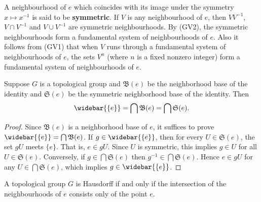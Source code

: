 A neighbourhood of $e$ which coincides with its image under the symmetry $x\mapsto x^{-1}$ is said to be \textbf{symmetric}. If $V$ is any neighbourhood of $e$, then $VV^{-1}$, $V\cap V^{-1}$ and $V\cup V^{-1}$ are symmetric neighbourhoods. By (GV2), the symmetric neighbourhoods form a fundamental system of neighbourhoods of $e$. Also it follows from (GV1) that when $V$ runs through a fundamental system of neighbourhoods of $e$, the sets $V^n$ (where $n$ is a fixed nonzero integer) form a fundamental system of neighbourhoods of $e$.
\begin{corollary}\label{topological group closure of e}
Suppose $G$ is a topological group and $\mathfrak{B}(e)$ be the neighborhood base of the identity and $\mathfrak{S}(e)$ be the symmetric neighborhood base of the identity. Then
\[\widebar{\{e\}}=\bigcap\mathfrak{B}(e)=\bigcap\mathfrak{S}(e).\]
\end{corollary}
\begin{proof}
Since $\mathfrak{B}(e)$ is a neighborhood base of $e$, it suffices to prove $\widebar{\{e\}}=\bigcap\mathfrak{B}(e)$. If $g\in\widebar{\{e\}
}$, then for every $U\in\mathfrak{S}(e)$, the set $gU$ meets $\{e\}$. That is, $e\in gU$. Since $U$ is symmetric, this implies $g\in U$ for all $U\in\mathfrak{S}(e)$. Conversely, if $g\in\bigcap\mathfrak{S}(e)$ then $g^{-1}\in\bigcap\mathfrak{S}(e)$. Hence $e\in gU$ for any $U\in\bigcap\mathfrak{S}(e)$, which implies $g\in\widebar{\{e\}}$.
\end{proof}
\begin{corollary}\label{topological group Huasdorff iff}
A topological group $G$ is Hausdorff if and only if the intersection of the neighbourhoods of $e$ consists only of the point $e$.
\end{corollary}
